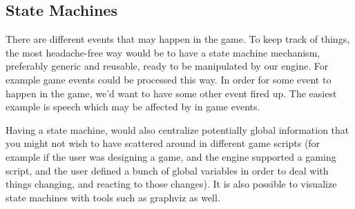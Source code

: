 \subsection{State Machines}

There are different events that may happen in the game. To keep track of
things, the most headache-free way would be to have a state machine mechanism,
preferably generic and reusable, ready to be manipulated by our engine. For
example game events could be processed this way. In order for some event to
happen in the game, we'd want to have some other event fired up. The easiest
example is speech which may be affected by in game events.

Having a state machine, would also centralize potentially global information
that you might not wish to have scattered around in different game scripts (for
example if the user was designing a game, and the engine supported a gaming
script, and the user defined a bunch of global variables in order to deal with
things changing, and reacting to those changes). It is also possible to visualize
state machines with tools such as graphviz as well.
